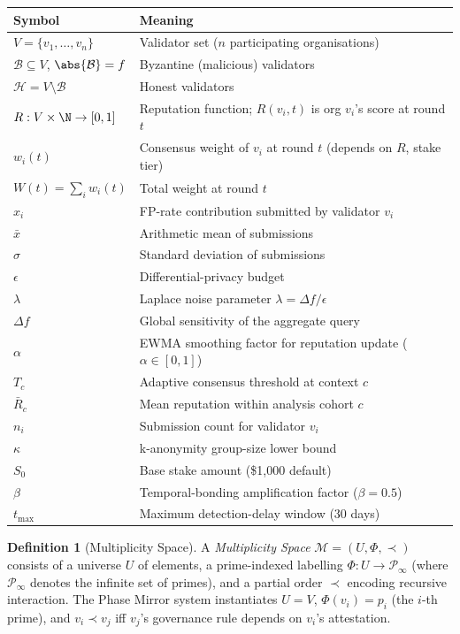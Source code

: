 \documentclass[12pt,a4paper]{article}
\theoremstyle{definition}
\newtheorem{definition}[theorem]{Definition}
\theoremstyle{remark}
\begin{document}
\begin{center}
\begin{longtable}{@{}lp{10cm}@{}}
\toprule
\textbf{Symbol} & \textbf{Meaning} \\
\midrule
$V = \{v_1,\dots,v_n\}$ & Validator set ($n$ participating organisations) \\
$\mathcal{B} \subseteq V$, $\abs{\mathcal{B}}=f$ & Byzantine (malicious) validators \\
$\mathcal{H} = V\setminus\mathcal{B}$ & Honest validators \\
$R: V\times\N \to [0,1]$ & Reputation function; $R(v_i,t)$ is org $v_i$'s score at round $t$ \\
$w_i(t)$ & Consensus weight of $v_i$ at round $t$ (depends on $R$, stake tier) \\
$W(t) = \sum_{i} w_i(t)$ & Total weight at round $t$ \\
$x_i$ & FP-rate contribution submitted by validator $v_i$ \\
$\bar{x}$ & Arithmetic mean of submissions \\
$\sigma$ & Standard deviation of submissions \\
$\epsilon$ & Differential-privacy budget \\
$\lambda$ & Laplace noise parameter $\lambda = \Delta f / \epsilon$ \\
$\Delta f$ & Global sensitivity of the aggregate query \\
$\alpha$ & EWMA smoothing factor for reputation update ($\alpha \in [0,1]$) \\
$T_c$ & Adaptive consensus threshold at context $c$ \\
$\bar{R}_c$ & Mean reputation within analysis cohort $c$ \\
$n_i$ & Submission count for validator $v_i$ \\
$\kappa$ & k-anonymity group-size lower bound \\
$S_0$ & Base stake amount (\$1{,}000 default) \\
$\beta$ & Temporal-bonding amplification factor ($\beta=0.5$) \\
$t_{\max}$ & Maximum detection-delay window (30 days) \\
\bottomrule
\end{longtable}
\end{center}

\begin{definition}[Multiplicity Space]
A \emph{Multiplicity Space} $\mathcal{M}=(U,\Phi,\prec)$ consists of a universe $U$ of
elements, a prime-indexed labelling $\Phi: U \to \mathcal{P}_\infty$ (where
$\mathcal{P}_\infty$ denotes the infinite set of primes), and a partial order $\prec$
encoding recursive interaction. The Phase Mirror system instantiates $U = V$,
$\Phi(v_i) = p_i$ (the $i$-th prime), and $v_i \prec v_j$ iff $v_j$'s governance rule
depends on $v_i$'s attestation.
\end{definition}
\end{document}
